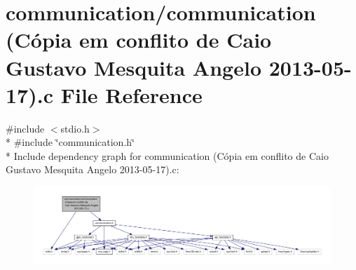 \hypertarget{communication_01_07C_xC3_xB3pia_01em_01conflito_01de_01Caio_01Gustavo_01Mesquita_01Angelo_012013-05-17_08_8c}{\section{communication/communication (Cópia em conflito de Caio Gustavo Mesquita Angelo 2013-\/05-\/17).c File Reference}
\label{communication_01_07C_xC3_xB3pia_01em_01conflito_01de_01Caio_01Gustavo_01Mesquita_01Angelo_012013-05-17_08_8c}
}
{\ttfamily \#include $<$stdio.\-h$>$}\\*
{\ttfamily \#include \char`\"{}communication.\-h\char`\"{}}\\*
Include dependency graph for communication (Cópia em conflito de Caio Gustavo Mesquita Angelo 2013-\/05-\/17).c\-:\nopagebreak
\begin{figure}[H]
\begin{center}
\leavevmode
\includegraphics[width=350pt]{communication_01_07C_xC3_xB3pia_01em_01conflito_01de_01Caio_01Gustavo_01Mesquita_01Angelo_012013-05-17_08_8c__incl}
\end{center}
\end{figure}
